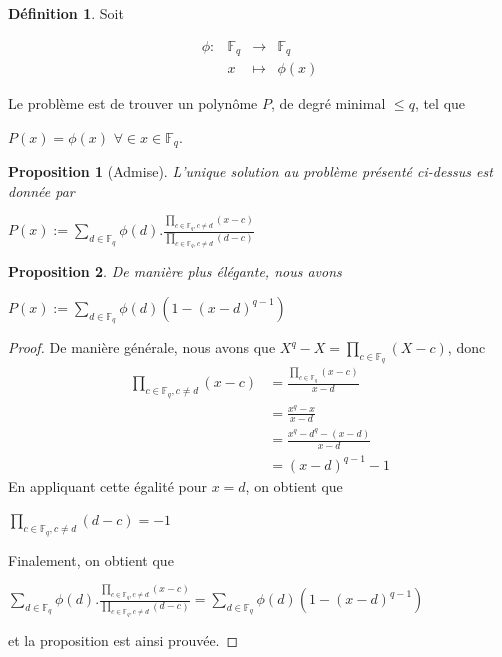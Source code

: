 \documentclass[12pt]{article}
\newcommand{\Fq}{\mathds{F}_q}
\newcommand{\fonction}[5]{
\begin{displaymath}
\begin{array}{l|rcl}
\displaystyle
#1 : & #2 & \longrightarrow & #3 \\
    & #4 & \longmapsto & #5
\end{array}
\end{displaymath}
}
\newtheorem{prop}{Proposition}
\theoremstyle{definition}
\newtheorem{definition}{Définition}
\begin{document}
\begin{definition}
Soit
\fonction{\phi}{\Fq}{\Fq}{x}{\phi(x)}
Le problème est de trouver un polynôme $P$, de degré minimal $\le q$, tel que 
	\begin{center} $P(x) = \phi(x)$ $\forall  \in  x \in \Fq$. \end{center}
\end{definition}

\begin{prop}[Admise]
L'unique solution au problème présenté ci-dessus est donnée par 
	\begin{center} $P(x) := \displaystyle\sum_{d \in \Fq} \phi(d).\displaystyle\frac{\displaystyle\prod_{c \in \Fq, c \ne d }(x - c)}{\displaystyle\prod_{c \in \Fq, c \ne d}(d -c)}$\end{center}
\end{prop}

\begin{prop}
De manière plus élégante, nous avons
	\begin{center} $P(x) := \displaystyle \sum_{d \in \Fq } \phi(d) (1 - (x-d)^{q-1}) $ \end{center}
\end{prop}

\begin{proof}De manière générale, nous avons que $X^q - X = \displaystyle\prod_{c \in \Fq} (X-c)$, donc \newline
	\begin{align*} 
		\displaystyle\prod_{c \in \Fq, c \ne d}(x - c) &= \frac{\displaystyle\prod_{c \in \Fq}(x - c)}{x - d}\\
		 &= \displaystyle\frac{x^q - x}{x-d} \\
		 &= \displaystyle\frac{x^q - d^q - (x-d)}{x-d} \\
		 &= (x-d)^{q-1} - 1
	\end{align*}
En appliquant cette égalité pour $x = d$, on obtient que \begin{center} $\displaystyle\prod_{c \in \Fq, c \ne d }(d - c) = -1$ \end{center}
Finalement, on obtient que 
\begin{center} $ \displaystyle\sum_{d \in \Fq} \phi(d).\displaystyle\frac{\displaystyle\prod_{c \in \Fq, c \ne d }(x - c)}{\displaystyle\prod_{c \in \Fq, c \ne d}(d -c)} =  \displaystyle \sum_{d \in \Fq } \phi(d) (1 - (x-d)^{q-1})$  \end{center}
et la proposition est ainsi prouvée.
\end{proof}
\end{document}
